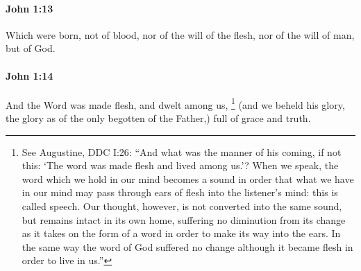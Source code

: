		\paragraph{John 1:13} %
			\label{JOHN-1-13}

			Which were born, not of blood, nor of the will of the flesh, nor of the will of man, but of God.

			\begin{framed}
			\scriptsize
				\begin{compactdesc}
					\item[SBLG] 
				\end{compactdesc}
			\end{framed}

		\paragraph{John 1:14} %
			\label{JOHN-1-14}

			And the Word was made flesh, and dwelt among us,%
				\footnote{%
					See Augustine, DDC I:26: ``And what was the manner of his coming, if not this: `The word was made flesh and lived among us.'? When we speak, the word which we hold in our mind becomes a sound in order that what we have in our mind may pass through ears of flesh into the listener's mind: this is called speech. Our thought, however, is not converted into the same sound, but remains intact in its own home, suffering no diminution from its change as it takes on the form of a word in order to make its way into the ears. In the same way the word of God suffered no change although it became flesh in order to live in us.''
					}
			(and we beheld his glory, the glory as of the only begotten of the Father,) full of grace and truth.

